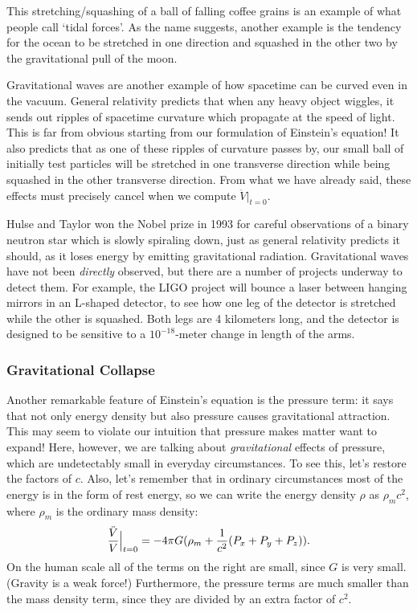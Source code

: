This stretching/squashing of a ball of falling coffee grains is an
example of what people call `tidal forces'.  As the name suggests, another
example is the tendency for the ocean to be stretched in one direction
and squashed in the other two by the gravitational pull of the moon.  

Gravitational waves are another example of how spacetime can be curved
even in the vacuum.   General relativity predicts that when any heavy 
object wiggles, it sends out ripples of spacetime curvature which 
propagate at the speed of light.  This is far from obvious starting from
our formulation of Einstein's equation!  It also predicts
that as one of these ripples of curvature passes by, our small ball of
initially test particles will be stretched in one transverse
direction while being squashed in the other transverse direction.   
From what we have already said, these effects must precisely cancel 
when we compute $\ddot V|_{t = 0}$.  

Hulse and Taylor won the Nobel prize in 1993 for careful observations of
a binary neutron star which is slowly spiraling down, just as general
relativity predicts it should, as it loses energy by emitting 
gravitational radiation.  Gravitational waves have not been {\it
directly} observed, but there are a number of projects underway to
detect them.  For example, the LIGO project will bounce a laser between
hanging mirrors in an L-shaped detector, to see how one leg of the
detector is stretched while the other is squashed.  Both legs are 
4 kilometers long, and the detector is designed to be sensitive
to a $10^{-18}$-meter change in length of the arms.  

\subsubsection*{Gravitational Collapse}

Another remarkable feature of Einstein's equation is the pressure term: it 
says that not only energy density but also pressure causes gravitational
attraction.  This may seem to violate our intuition that pressure makes
matter want to expand!  Here, however, we are talking about {\it
gravitational} effects of pressure, which are undetectably small in
everyday circumstances. To see this, let's restore the factors
of $c$.  Also, let's remember that in ordinary circumstances
most of the energy is in the form of rest energy, so we can
write the energy density $\rho$ as $\rho_m c^2$, 
where $\rho_m$ is the ordinary mass
density:
\[   {\ddot V\over V}\Bigr|_{t = 0} 
= -{4\pi G}(\rho_m + {1\over c^2}(P_x + P_y + P_z)). \]
On the human scale all of the terms on the right are small, 
since $G$ is very small.  (Gravity is a weak force!)
Furthermore, the pressure terms are much smaller than the mass density
term, since they are divided by an extra factor of $c^2$. 

